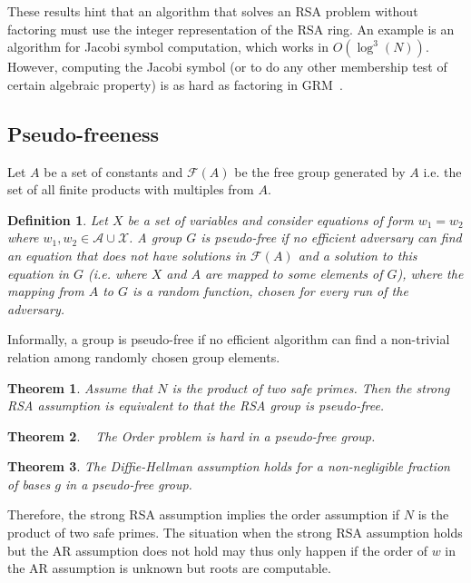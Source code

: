 \documentclass[a4paper]{article}
\newtheorem{definition}{Definition}
\newtheorem{theorem}{Theorem}
\begin{document}
These results hint that an algorithm that solves an RSA problem without factoring must use the integer representation of the RSA ring. An example is an algorithm for Jacobi symbol computation, which works in $O(\log^3(N))$. However,  computing the Jacobi symbol (or to do any other membership test of certain algebraic property) is as hard as factoring in GRM~\cite{DBLP:journals/joc/JagerS13}.


\subsection{Pseudo-freeness}

Let $A$ be a set of constants and $\mathcal{F}(A)$ be the free group generated by $A$ i.e. the set of all finite products with multiples from $A$. 
\begin{definition}Let $X$ be a set of variables and consider equations of form $w_1 = w_2$ where $w_1,w_2\in\mathcal{A\cup X}$. A group $G$ is \emph{pseudo-free} if no efficient adversary can find an equation that does not have solutions in $\mathcal{F}(A)$ and a solution to this equation in $G$ (i.e. where $X$ and $A$ are mapped to some elements of $G$), where the mapping from $A$ to $G$ is a random function, chosen for every run of the adversary.
\end{definition}

Informally, a group is pseudo-free if no efficient algorithm can find a non-trivial relation among randomly chosen group elements.

\begin{theorem}\cite{DBLP:conf/tcc/Rivest04,DBLP:conf/eurocrypt/Micciancio05}
Assume that $N$ is the product of two safe primes. Then the strong RSA assumption is equivalent to that the RSA group is pseudo-free.
\end{theorem}

\begin{theorem}~\cite{DBLP:conf/tcc/Rivest04} The Order problem is hard in a pseudo-free group.
\end{theorem}

\begin{theorem}\cite{DBLP:journals/ijisec/HasegawaIST09}
The Diffie-Hellman assumption holds for a non-negligible fraction of bases $g$ in a pseudo-free group.
\end{theorem}

Therefore, the strong RSA assumption implies the order assumption if $N$ is the product of two safe primes. The situation when the strong RSA assumption holds but the AR assumption does not hold may thus only happen if the order of $w$ in the AR assumption is unknown but roots are computable. 
\end{document}
